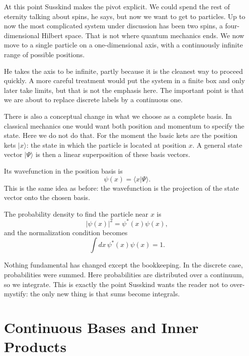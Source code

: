 At this point Susskind makes the pivot explicit. We could spend the rest of eternity talking about spins, he says, but now we want to get to particles. Up to now the most complicated system under discussion has been two spins, a four-dimensional Hilbert space. That is not where quantum mechanics ends. We now move to a single particle on a one-dimensional axis, with a continuously infinite range of possible positions.

He takes the axis to be infinite, partly because it is the cleanest way to proceed quickly. A more careful treatment would put the system in a finite box and only later take limits, but that is not the emphasis here. The important point is that we are about to replace discrete labels by a continuous one.

There is also a conceptual change in what we choose as a complete basis. In classical mechanics one would want both position and momentum to specify the state. Here we do not do that. For the moment the basic kets are the position kets \(|x\rangle\): the state in which the particle is located at position \(x\). A general state vector \(|\Psi\rangle\) is then a linear superposition of these basis vectors.

Its wavefunction in the position basis is
\begin{equation}
\psi(x)=\langle x|\Psi\rangle.
\end{equation}
This is the same idea as before: the wavefunction is the projection of the state vector onto the chosen basis.

The probability density to find the particle near \(x\) is
\begin{equation}
|\psi(x)|^2=\psi^*(x)\psi(x),
\end{equation}
and the normalization condition becomes
\begin{equation}
\int dx\,\psi^*(x)\psi(x)=1.
\end{equation}

Nothing fundamental has changed except the bookkeeping. In the discrete case, probabilities were summed. Here probabilities are distributed over a continuum, so we integrate. This is exactly the point Susskind wants the reader not to over-mystify: the only new thing is that sums become integrals.

\section{Continuous Bases and Inner Products}

